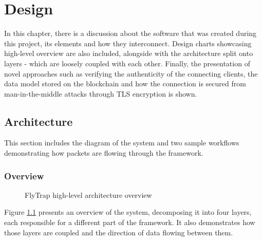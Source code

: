 \chapter{Design\label{chap:design}}
In this chapter, there is a discussion about the software that was created during this project, its elements and how they interconnect. Design charts showcasing high-level overview are also included, alongside with the architecture split onto layers - which are loosely coupled with each other. Finally, the presentation of novel approaches such as verifying the authenticity of the connecting clients, the data model stored on the blockchain and how the connection is secured from man-in-the-middle attacks through TLS encryption is shown.

\section{Architecture}\label{sec:arch}
This section includes the diagram of the system and two sample workflows demonstrating how packets are flowing through the framework.
\subsection{Overview}
\begin{figure}[h]
    \centering
    \caption{FlyTrap high-level architecture overview}
    \label{fig:flytrap}
\end{figure}
Figure \ref{fig:flytrap} presents an overview of the system, decomposing it into four layers, each responsible for a different part of the framework. It also demonstrates how those layers are coupled and the direction of data flowing between them.

